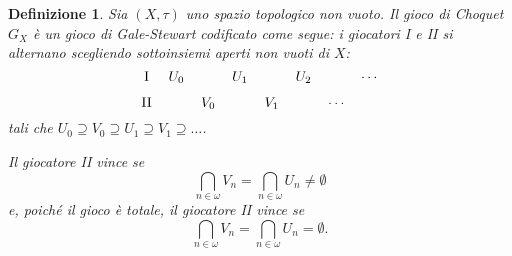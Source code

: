 \documentclass[titlepage]{article}
\newcommand{\1}{\mathds{1}}
\theoremstyle{definition}%
\theoremstyle{plain}
\newtheorem{defn}[thm]{Definizione}
\theoremstyle{remark}
\begin{document}
\begin{defn}
Sia \((X,\tau)\) uno {spazio topologico} non vuoto. Il gioco di Choquet \(G_{X}\) è un {gioco} {di Gale-Stewart} codificato come segue: i giocatori I e II si alternano scegliendo sottoinsiemi aperti non vuoti di \(X\):
\begin{equation*}
\begin{tikzcd}[ampersand replacement=\&,cramped,sep=tiny]
	{\text{I}} \& {U_0} \&\& {U_1} \&\& {U_2} \&\& \cdots \\
	{\text{II}} \&\& {V_0} \&\& {V_1} \&\& \cdots
\end{tikzcd}
\end{equation*}
tali che \(U_{0} \supseteq V_{0}\supseteq U_{1}\supseteq V_{1}\supseteq \dots\).

Il giocatore II vince se
\begin{equation*}
\bigcap_{n \in \omega} V_{n} = \bigcap_{n \in \omega} U_{n} \neq \emptyset
\end{equation*}
e, poiché il gioco è {totale}, il giocatore II vince se
\begin{equation*}
\bigcap_{n \in \omega} V_{n} = \bigcap_{n \in \omega} U_{n} = \emptyset.
\end{equation*}
\end{defn}
\end{document}
